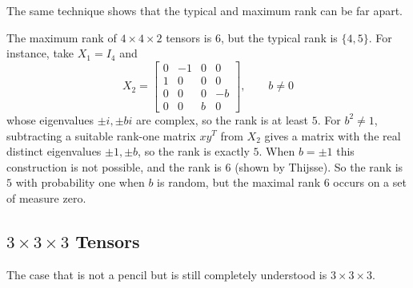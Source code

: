   The same technique shows that the typical and maximum rank can be far apart.

  \begin{example}
    The maximum rank of $4 \times 4 \times 2$ tensors is $6$, but the typical rank is $\{4, 5\}$. For instance, take $X_1 = I_4$ and
    \begin{equation}
      X_2 = \begin{bmatrix} 0 & -1 & 0 & 0 \\ 1 & 0 & 0 & 0 \\ 0 & 0 & 0 & -b \\ 0 & 0 & b & 0 \end{bmatrix}, \qquad b \neq 0
    \end{equation}
    whose eigenvalues $\pm i, \pm bi$ are complex, so the rank is at least $5$. For $b^2 \neq 1$, subtracting a suitable rank-one matrix $x y^T$ from $X_2$ gives a matrix with the real distinct eigenvalues $\pm 1, \pm b$, so the rank is exactly $5$. When $b = \pm 1$ this construction is not possible, and the rank is $6$ (shown by Thijsse). So the rank is $5$ with probability one when $b$ is random, but the maximal rank $6$ occurs on a set of measure zero.
  \end{example}

\subsection{$3 \times 3 \times 3$ Tensors}

  The case that is not a pencil but is still completely understood is $3 \times 3 \times 3$.

